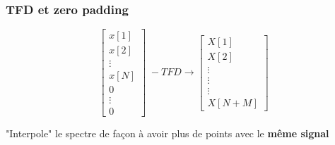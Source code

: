 \documentclass{beamer}
\begin{document}
\begin{frame}
\frametitle{TFD et zero padding}

\[
\begin{bmatrix} x[1] \\ x[2] \\ \vdots \\ x[N] \\ 0 \\ \vdots \\ 0 \end{bmatrix} \; -TFD \rightarrow  
\begin{bmatrix} X[1] \\ X[2] \\ \vdots \\  \vdots \\  \vdots \\ X[N+M] \end{bmatrix}
\]
\vspace{0.5cm}

"Interpole" le spectre de façon à avoir plus de points avec le \textbf{même signal}

\end{frame}
\end{document}
